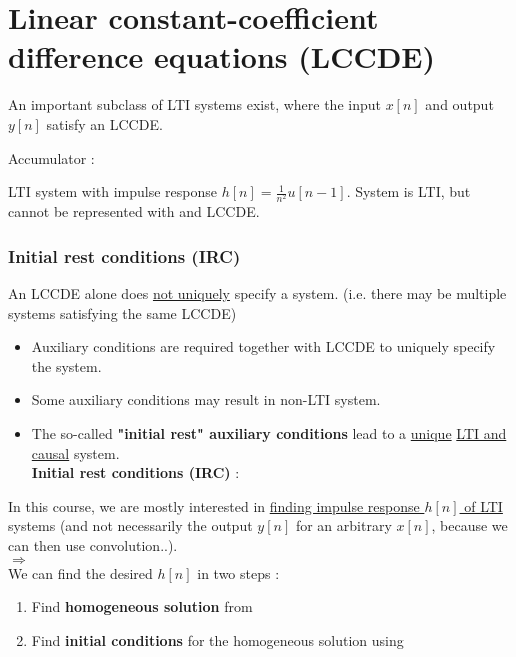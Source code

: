 \documentclass[10pt,a4paper,report]{report}       %
\begin{document}
\section{Linear constant-coefficient difference equations (LCCDE)}
An important subclass of LTI systems exist, where the input $x[n]$ and output $y[n]$ satisfy an  LCCDE.\\ \vspace{1.5cm}

\ex Accumulator : \\
\vspace{3cm}

\ex LTI system with impulse response $h[n]=\frac{1}{n^2}u[n-1]$. System is LTI, but cannot be represented with and LCCDE.\\

\subsubsection{Initial rest conditions (IRC)}
An LCCDE alone does \underline{not uniquely} specify a system. (i.e. there may be multiple systems satisfying the same LCCDE)
\begin{itemize}
  \item Auxiliary conditions are required together with LCCDE to uniquely specify the system.
  \item Some auxiliary conditions may result in non-LTI system.
  \item The so-called \textbf{"initial rest" auxiliary conditions} lead to a \underline{unique} \underline{LTI and causal} system.\\
  \textbf{Initial rest conditions (IRC)} :\\
  \vspace{1cm}
\end{itemize}

In this course, we are mostly interested in \underline{finding impulse response $h[n]$ of LTI} systems (and not necessarily the output $y[n]$ for an arbitrary $x[n]$, because we can then use convolution..).\\  
$\Longrightarrow$ \\ 

We can find the desired $h[n]$ in two steps :
\begin{enumerate}
  \item Find \textbf{homogeneous solution} from \\
  \vspace{1cm}
  \item Find \textbf{initial conditions} for the homogeneous solution using \\
  \vspace{1cm}
\end{enumerate}
\end{document}

